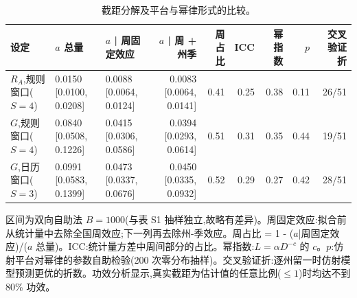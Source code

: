\begin{table}[htbp]
\centering
\footnotesize
\caption{截距分解及平台与幂律形式的比较。}
\label{tab:s2}
\begin{tabular}{lllrrrrrr}
\toprule
设定 & $a$ 总量 & $a$ | 周固定效应 & $a$ | 周 + 州季 & 周占比 & ICC & 幂指数 & $p$ & 交叉验证折 \\
\midrule
$R_A$,规则窗口($S=4$) & 0.0150 [0.0100, 0.0208] & 0.0088 [0.0064, 0.0124] & 0.0083 [0.0064, 0.0141] & 0.41 & 0.25 & 0.38 & 0.11 & 26/51 \\
$G$,规则窗口($S=4$) & 0.0840 [0.0508, 0.1226] & 0.0415 [0.0306, 0.0586] & 0.0394 [0.0293, 0.0614] & 0.51 & 0.31 & 0.35 & 0.44 & 19/51 \\
$G$,日历窗口($S=3$) & 0.0991 [0.0583, 0.1399] & 0.0473 [0.0337, 0.0676] & 0.0450 [0.0335, 0.0932] & 0.52 & 0.29 & 0.27 & 0.42 & 28/51 \\
\bottomrule
\end{tabular}
\par\smallskip
\begin{minipage}{0.95\linewidth}\scriptsize 区间为双向自助法 $B=1000$(与表 S1 抽样独立,故略有差异)。周固定效应:拟合前从统计量中去除全国周效应;下一列再去除州-季效应。周占比 = 1 - ($a$|周固定效应)/($a$ 总量)。ICC:统计量方差中周间部分的占比。幂指数:$L=\alpha D^{-c}$ 的 $c$。$p$:仿射平台对幂律的参数自助检验(200 次零分布抽样)。交叉验证折:逐州留一时仿射模型预测更优的折数。功效分析显示,真实截距为估计值的任意比例($\le 1$)时均达不到 80\% 功效。\end{minipage}
\end{table}
